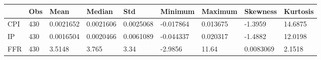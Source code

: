 \begin{tabular}{lllllllll}
\toprule 
& Obs & Mean & Median & Std & Minimum & Maximum & Skewness & Kurtosis \\ 
\midrule 
CPI & 430 & 0.0021652 & 0.0021606 & 0.0025068 & -0.017864 & 0.013675 & -1.3959 & 14.6875 \\ 
IP & 430 & 0.0016504 & 0.0020466 & 0.0061089 & -0.044337 & 0.020317 & -1.4882 & 12.0198 \\ 
FFR & 430 & 3.5148 & 3.765 & 3.34 & -2.9856 & 11.64 & 0.0083069 & 2.1518 \\ 
\bottomrule 
\end{tabular}